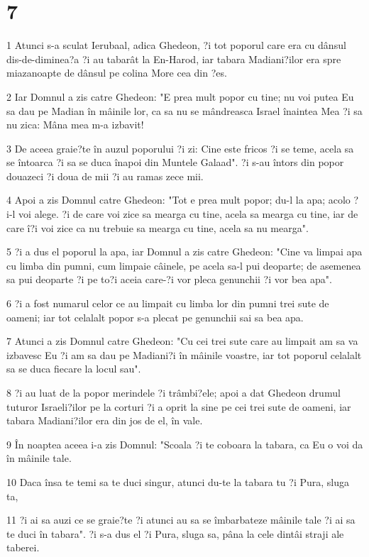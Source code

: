 \chapter{7}

\par 1 Atunci s-a sculat Ierubaal, adica Ghedeon, ?i tot poporul care era cu dânsul dis-de-diminea?a ?i au tabarât la En-Harod, iar tabara Madiani?ilor era spre miazanoapte de dânsul pe colina More cea din ?es.
\par 2 Iar Domnul a zis catre Ghedeon: "E prea mult popor cu tine; nu voi putea Eu sa dau pe Madian în mâinile lor, ca sa nu se mândreasca Israel înaintea Mea ?i sa nu zica: Mâna mea m-a izbavit!
\par 3 De aceea graie?te în auzul poporului ?i zi: Cine este fricos ?i se teme, acela sa se întoarca ?i sa se duca înapoi din Muntele Galaad". ?i s-au întors din popor douazeci ?i doua de mii ?i au ramas zece mii.
\par 4 Apoi a zis Domnul catre Ghedeon: "Tot e prea mult popor; du-l la apa; acolo ?i-l voi alege. ?i de care voi zice sa mearga cu tine, acela sa mearga cu tine, iar de care î?i voi zice ca nu trebuie sa mearga cu tine, acela sa nu mearga".
\par 5 ?i a dus el poporul la apa, iar Domnul a zis catre Ghedeon: "Cine va limpai apa cu limba din pumni, cum limpaie câinele, pe acela sa-l pui deoparte; de asemenea sa pui deoparte ?i pe to?i aceia care-?i vor pleca genunchii ?i vor bea apa".
\par 6 ?i a fost numarul celor ce au limpait cu limba lor din pumni trei sute de oameni; iar tot celalalt popor s-a plecat pe genunchii sai sa bea apa.
\par 7 Atunci a zis Domnul catre Ghedeon: "Cu cei trei sute care au limpait am sa va izbavesc Eu ?i am sa dau pe Madiani?i în mâinile voastre, iar tot poporul celalalt sa se duca fiecare la locul sau".
\par 8 ?i au luat de la popor merindele ?i trâmbi?ele; apoi a dat Ghedeon drumul tuturor Israeli?ilor pe la corturi ?i a oprit la sine pe cei trei sute de oameni, iar tabara Madiani?ilor era din jos de el, în vale.
\par 9 În noaptea aceea i-a zis Domnul: "Scoala ?i te coboara la tabara, ca Eu o voi da în mâinile tale.
\par 10 Daca însa te temi sa te duci singur, atunci du-te la tabara tu ?i Pura, sluga ta,
\par 11 ?i ai sa auzi ce se graie?te ?i atunci au sa se îmbarbateze mâinile tale ?i ai sa te duci în tabara". ?i s-a dus el ?i Pura, sluga sa, pâna la cele dintâi straji ale taberei.
